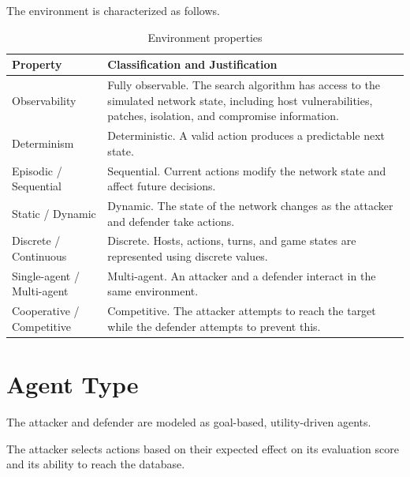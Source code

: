 \documentclass[12pt,a4paper]{article}
\begin{document}
The environment is characterized as follows.

\begin{table}[H]
\centering
\begin{tabular}{p{} p{}}
\toprule
\textbf{Property} & \textbf{Classification and Justification} \\
\midrule

Observability &
Fully observable. The search algorithm has access to the simulated network
state, including host vulnerabilities, patches, isolation, and compromise
information. \\

Determinism &
Deterministic. A valid action produces a predictable next state. \\

Episodic / Sequential &
Sequential. Current actions modify the network state and affect future
decisions. \\

Static / Dynamic &
Dynamic. The state of the network changes as the attacker and defender take
actions. \\

Discrete / Continuous &
Discrete. Hosts, actions, turns, and game states are represented using
discrete values. \\

Single-agent / Multi-agent &
Multi-agent. An attacker and a defender interact in the same environment. \\

Cooperative / Competitive &
Competitive. The attacker attempts to reach the target while the defender
attempts to prevent this. \\

\bottomrule
\end{tabular}
\caption{Environment properties}
\end{table}


\section{Agent Type}

The attacker and defender are modeled as goal-based, utility-driven agents.

The attacker selects actions based on their expected effect on its evaluation
score and its ability to reach the database.
\end{document}
